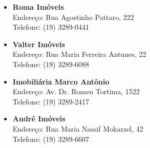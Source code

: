\begin{itemize}
\item   \textbf{Roma Imóveis}
        \\Endereço: Rua Agostinho Pattaro, 222
        \\Telefone: (19) 3289-0441

\item   \textbf{Valter Imóveis}
        \\Endereço: Rua Maria Ferreira Antunes, 22
        \\Telefone: (19) 3289-6088

\item   \textbf{Imobiliária Marco Antônio}
        \\Endereço: Av. Dr. Romeu Tortima, 1522
        \\Telefone: (19) 3289-2417

\item   \textbf{André Imóveis}
        \\Endereço: Rua Maria Nassif Mokarzel, 42
        \\Telefone: (19) 3289-6607

\end{itemize}
